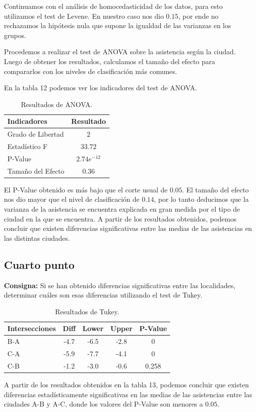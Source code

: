 \documentclass{article} %
\begin{document}
Continuamos con el análisis de homocedasticidad de los datos, para esto utilizamos el test de Levene. En nuestro caso nos dio $0.15$, por ende no rechazamos la hipótesis nula que supone la igualdad de las varianzas en los grupos.

Procedemos a realizar el test de ANOVA sobre la asistencia según la ciudad. Luego de obtener los resultados, calculamos el tamaño del efecto para compararlos con los niveles de clasificación más comunes. 

En la tabla 12 podemos ver los indicadores del test de ANOVA.

\begin{table}[H]
	\centering
		\begin{tabular}{||l | c||}
			\hline
			\hline
			Indicadores & Resultado\\
			\hline			
			\hline
			Grado de Libertad & $2$\\
			\hline
			Estadístico F & $33.72$\\
			\hline
			P-Value & $2.74e^{-12}$\\
			\hline
			Tamaño del Efecto & $0.36$\\
			\hline
			\hline
		\end{tabular}
		\caption{Resultados de ANOVA.}
	\label{tab:table-punto-4-3}
\end{table}

El P-Value obtenido es más bajo que el corte usual de $0.05$. El tamaño del efecto nos dio mayor que el nivel de clasificación de $0.14$, por lo tanto deducimos que la varianza de la asistencia se encuentra explicada en gran medida por el tipo de ciudad en la que se encuentra. A partir de los resultados obtenidos, podemos concluir que existen diferencias significativas entre las medias de las asistencias en las distintas ciudades.

\subsection{Cuarto punto}

\textbf{Consigna:} Si se han obtenido diferencias significativas entre las localidades, determinar cuáles son esas diferencias utilizando el test de Tukey.


\begin{table}[H]
	\centering
		\begin{tabular}{||l | c | c | c | c ||}
			\hline
			\hline
			Intersecciones & Diff & Lower & Upper & P-Value\\
			\hline			
			\hline
			B-A & -4.7 & -6.5 & -2.8 & 0\\
			\hline
			C-A & -5.9 & -7.7 & -4.1 & 0\\
			\hline
			C-B & -1.2 & -3.0 & -0.6 & 0.258\\
			\hline
			\hline
		\end{tabular}
		\caption{Resultados de Tukey.}
	\label{tab:table-punto-4-3}
\end{table}

A partir de los resultados obtenidos en la tabla 13, podemos concluir que existen diferencias estadísticamente significativas en las medias de las asistencias entre las ciudades A-B y A-C, donde los valores del P-Value son menores a $0.05$.
\end{document}
